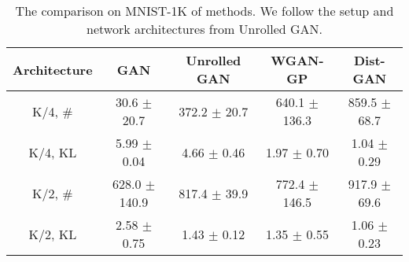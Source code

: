 \documentclass[runningheads]{llncs}
\begin{document}
\begin{table*}
\centering
\scriptsize
\caption{The comparison on MNIST-1K of methods. We follow the setup and network architectures from Unrolled GAN.}
\begin{tabular}{c | c | c | c | c}
\textbf{Architecture} & \textbf{GAN} & \textbf{Unrolled GAN} & \textbf{WGAN-GP} & \textbf{Dist-GAN}\\ 
\hline
K/4, \# & 30.6 $\pm$ 20.7 & 372.2 $\pm$ 20.7 & 640.1 $\pm$ 136.3 & 859.5 $\pm$ 68.7 \\ 
K/4, KL & 5.99 $\pm$ 0.04 & 4.66 $\pm$ 0.46 & 1.97 $\pm$ 0.70 & 1.04 $\pm$ 0.29\\
\hline
K/2, \# & 628.0 $\pm$ 140.9 & 817.4 $\pm$ 39.9 & 772.4 $\pm$ 146.5 & 917.9 $\pm$ 69.6 \\ 
K/2, KL & 2.58 $\pm$ 0.75 & 1.43 $\pm$ 0.12 & 1.35 $\pm$ 0.55  & 1.06 $\pm$ 0.23
\end{tabular}
\label{mnist1k_comparison_01}
\end{table*}
\end{document}
